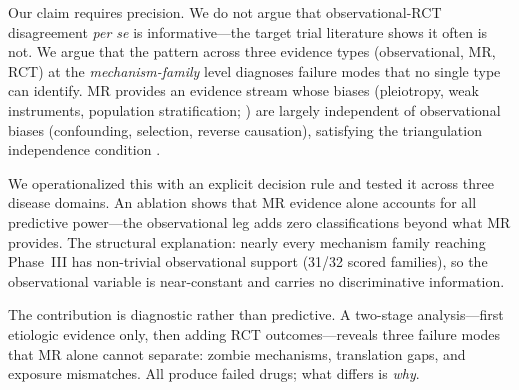 \documentclass[11pt]{article}
\begin{document}
Our claim requires precision. We do not argue that observational-RCT disagreement \emph{per se} is informative---the target trial literature shows it often is not. We argue that the pattern across three evidence types (observational, MR, RCT) at the \emph{mechanism-family} level diagnoses failure modes that no single type can identify. MR provides an evidence stream whose biases (pleiotropy, weak instruments, population stratification; \cite{daveysmith2014,gill2024pitfalls}) are largely independent of observational biases (confounding, selection, reverse causation), satisfying the triangulation independence condition \cite{hammerton2021}.

We operationalized this with an explicit decision rule and tested it across three disease domains. An ablation shows that MR evidence alone accounts for all predictive power---the observational leg adds zero classifications beyond what MR provides. The structural explanation: nearly every mechanism family reaching Phase~III has non-trivial observational support (31/32 scored families), so the observational variable is near-constant and carries no discriminative information.

The contribution is diagnostic rather than predictive. A two-stage analysis---first etiologic evidence only, then adding RCT outcomes---reveals three failure modes that MR alone cannot separate: zombie mechanisms, translation gaps, and exposure mismatches. All produce failed drugs; what differs is \emph{why}.
\end{document}
